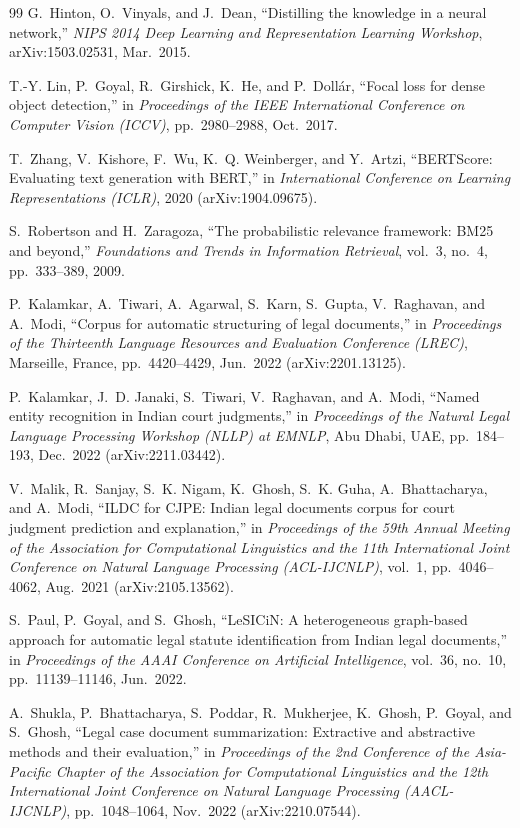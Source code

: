 \documentclass[11pt, oneside]{article}
\begin{document}
\begin{thebibliography}{99}
G.~Hinton, O.~Vinyals, and J.~Dean, ``Distilling the knowledge in a neural network,'' \emph{NIPS 2014 Deep Learning and Representation Learning Workshop}, arXiv:1503.02531, Mar.\ 2015.

T.-Y. Lin, P.~Goyal, R.~Girshick, K.~He, and P.~Doll{\'a}r, ``Focal loss for dense object detection,'' in \emph{Proceedings of the IEEE International Conference on Computer Vision (ICCV)}, pp.~2980--2988, Oct.\ 2017.

T.~Zhang, V.~Kishore, F.~Wu, K.~Q. Weinberger, and Y.~Artzi, ``BERTScore: Evaluating text generation with BERT,'' in \emph{International Conference on Learning Representations (ICLR)}, 2020 (arXiv:1904.09675).

S.~Robertson and H.~Zaragoza, ``The probabilistic relevance framework: BM25 and beyond,'' \emph{Foundations and Trends in Information Retrieval}, vol.~3, no.~4, pp.~333--389, 2009.

P.~Kalamkar, A.~Tiwari, A.~Agarwal, S.~Karn, S.~Gupta, V.~Raghavan, and A.~Modi, ``Corpus for automatic structuring of legal documents,'' in \emph{Proceedings of the Thirteenth Language Resources and Evaluation Conference (LREC)}, Marseille, France, pp.~4420--4429, Jun.\ 2022 (arXiv:2201.13125).

P.~Kalamkar, J.~D. Janaki, S.~Tiwari, V.~Raghavan, and A.~Modi, ``Named entity recognition in Indian court judgments,'' in \emph{Proceedings of the Natural Legal Language Processing Workshop (NLLP) at EMNLP}, Abu Dhabi, UAE, pp.~184--193, Dec.\ 2022 (arXiv:2211.03442).

V.~Malik, R.~Sanjay, S.~K. Nigam, K.~Ghosh, S.~K. Guha, A.~Bhattacharya, and A.~Modi, ``ILDC for CJPE: Indian legal documents corpus for court judgment prediction and explanation,'' in \emph{Proceedings of the 59th Annual Meeting of the Association for Computational Linguistics and the 11th International Joint Conference on Natural Language Processing (ACL-IJCNLP)}, vol.~1, pp.~4046--4062, Aug.\ 2021 (arXiv:2105.13562).

S.~Paul, P.~Goyal, and S.~Ghosh, ``LeSICiN: A heterogeneous graph-based approach for automatic legal statute identification from Indian legal documents,'' in \emph{Proceedings of the AAAI Conference on Artificial Intelligence}, vol.~36, no.~10, pp.~11139--11146, Jun.\ 2022.

A.~Shukla, P.~Bhattacharya, S.~Poddar, R.~Mukherjee, K.~Ghosh, P.~Goyal, and S.~Ghosh, ``Legal case document summarization: Extractive and abstractive methods and their evaluation,'' in \emph{Proceedings of the 2nd Conference of the Asia-Pacific Chapter of the Association for Computational Linguistics and the 12th International Joint Conference on Natural Language Processing (AACL-IJCNLP)}, pp.~1048--1064, Nov.\ 2022 (arXiv:2210.07544).

\end{thebibliography}
\end{document}
